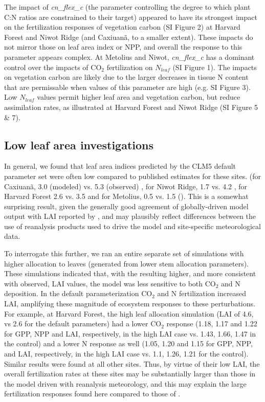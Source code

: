 \usepackage{}\documentclass[draft,linenumbers]{agujournal}
\begin{document}
The impact of \emph{cn\_flex\_c} (the parameter controlling the degree to which plant C:N ratios are constrained to their target) appeared to have its strongest impact on the fertilization responses of vegetation carbon (SI Figure 2)  at Harvard Forest and Niwot Ridge (and Caxiuan\~a, to a smaller extent). These impacts do not mirror those on leaf area index or NPP, and overall the response to this parameter appears complex.  At Metolius and Niwot, \emph{cn\_flex\_c} has a dominant control over the impacts of CO$_{2}$ fertilization on $N_{leaf}$ (SI Figure 1).  The impacts on vegetation carbon are likely due to the larger decreases in tissue N content that are permissable when values of this parameter are high (e.g. SI Figure 3).  Low  $N_{leaf}$ values permit higher leaf area and vegetation carbon, but reduce assimilation rates, as illustrated at Harvard Forest and Niwot Ridge (SI Figure 5 \& 7).  

\subsection{Low leaf area investigations}
In general, we found that leaf area indices predicted by the CLM5 default parameter set were often low  compared to published estimates for these sites. (for Caxiuan\~a, 3.0 (modeled) vs. 5.3 (observed) \cite{fisher2007}, for Niwot Ridge, 1.7 vs. 4.2 \cite{bowling2009}, for Harvard Forest 2.6 vs. 3.5 \cite{williams1996} and for Metolius, 0.5 vs. 1.5 (\cite{spadavecchia2011}). This is a somewhat surprising result, given the generally good agreement of globally-driven model output with LAI reported by \cite{lawrence2018}, and may plausibly reflect differences between the use of reanalysis products used to drive the model and site-specific meteorological data. 

To interrogate this further, we ran an entire separate set of simulations with higher allocation to leaves (generated from lower stem allocation parameters). These simulations indicated that, with the resulting higher, and more consistent with observed, LAI values, the model was less sensitive to both CO$_{2}$ and N deposition. In the default parameterization CO$_{2}$ and N fertilization increased LAI, amplifying these magnitude of ecosystem responses to these perturbations. For example, at Harvard Forest, the high leaf allocation simulation (LAI of 4.6, vs 2.6 for the default parameters) had a lower CO$_{2}$ response (1.18, 1.17 and 1.22 for GPP, NPP and LAI, respectively, in the high LAI case vs. 1.43, 1.66, 1.47 in the control) and a lower N response as well (1.05, 1.20 and 1.15 for GPP, NPP, and LAI, respectively, in the high LAI case vs. 1.1, 1.26, 1.21 for the control). Similar results were found at all other sites.  Thus, by virtue of their low LAI, the overall fertilization rates at these sites may be substantially larger than those in the model driven with reanalysis meteorology, and this may explain the large fertilization responses found here compared to those of \cite{wieder2019}. 
\end{document}
